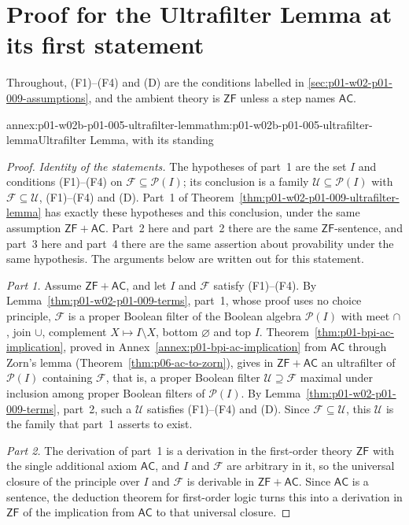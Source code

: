 \section{Proof for the Ultrafilter Lemma at its first statement}
\label{sec:annex-p01-w02b-p01-005-ultrafilter-lemma-entry}

Throughout, (F1)--(F4) and (D) are the conditions labelled in
\cref{sec:p01-w02-p01-009-assumptions}, and the ambient theory is
\(\mathsf{ZF}\) unless a step names \(\mathsf{AC}\).

\begin{annexitem}{annex:p01-w02b-p01-005-ultrafilter-lemma}{thm:p01-w02b-p01-005-ultrafilter-lemma}{Ultrafilter Lemma, with its standing}
\begin{proof}
\emph{Identity of the statements.} The hypotheses of part~1 are the set
\(I\) and conditions (F1)--(F4) on \(\mathcal F\subseteq\mathcal P(I)\); its
conclusion is a family \(\mathcal U\subseteq\mathcal P(I)\) with
\(\mathcal F\subseteq\mathcal U\), (F1)--(F4) and (D). Part~1 of
Theorem~\ref{thm:p01-w02-p01-009-ultrafilter-lemma} has exactly these
hypotheses and this conclusion, under the same assumption
\(\mathsf{ZF}+\mathsf{AC}\). Part~2 here and part~2 there are the same
\(\mathsf{ZF}\)-sentence, and part~3 here and part~4 there are the same
assertion about provability under the same hypothesis. The arguments below
are written out for this statement.

\emph{Part 1.} Assume \(\mathsf{ZF}+\mathsf{AC}\), and let \(I\) and
\(\mathcal F\) satisfy (F1)--(F4). By Lemma~\ref{thm:p01-w02-p01-009-terms},
part~1, whose proof uses no choice principle, \(\mathcal F\) is a proper
Boolean filter of the Boolean algebra \(\mathcal P(I)\) with meet \(\cap\),
join \(\cup\), complement \(X\mapsto I\setminus X\), bottom \(\varnothing\)
and top \(I\). Theorem~\ref{thm:p01-bpi-ac-implication}, proved in
Annex~\ref{annex:p01-bpi-ac-implication} from \(\mathsf{AC}\) through Zorn's
lemma (Theorem~\ref{thm:p06-ac-to-zorn}), gives in
\(\mathsf{ZF}+\mathsf{AC}\) an ultrafilter of \(\mathcal P(I)\) containing
\(\mathcal F\), that is, a proper Boolean filter
\(\mathcal U\supseteq\mathcal F\) maximal under inclusion among proper
Boolean filters of \(\mathcal P(I)\). By
Lemma~\ref{thm:p01-w02-p01-009-terms}, part~2, such a \(\mathcal U\)
satisfies (F1)--(F4) and (D). Since \(\mathcal F\subseteq\mathcal U\), this
\(\mathcal U\) is the family that part~1 asserts to exist.

\emph{Part 2.} The derivation of part~1 is a derivation in the first-order
theory \(\mathsf{ZF}\) with the single additional axiom \(\mathsf{AC}\), and
\(I\) and \(\mathcal F\) are arbitrary in it, so the universal closure of the
principle over \(I\) and \(\mathcal F\) is derivable in
\(\mathsf{ZF}+\mathsf{AC}\). Since \(\mathsf{AC}\) is a sentence, the
deduction theorem for first-order logic turns this into a derivation in
\(\mathsf{ZF}\) of the implication from \(\mathsf{AC}\) to that universal
closure.


\end{proof}
\end{annexitem}
